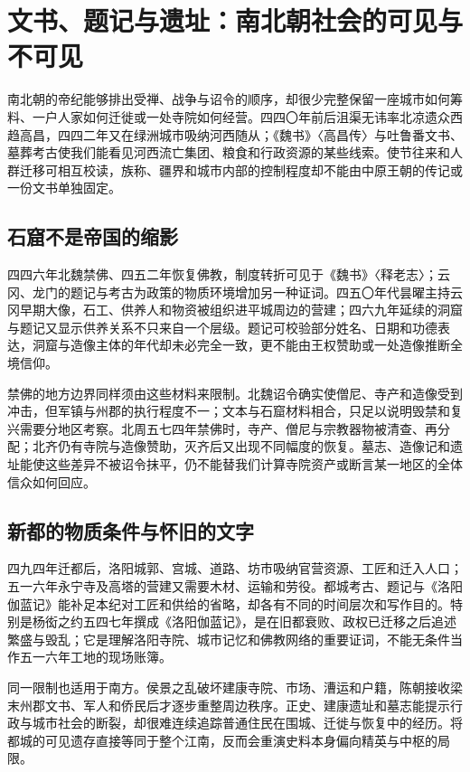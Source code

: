 \section{文书、题记与遗址：南北朝社会的可见与不可见}
\label{sec:northern-southern-documents-material}

南北朝的帝纪能够排出受禅、战争与诏令的顺序，却很少完整保留一座城市如何筹料、一户人家如何迁徙或一处寺院如何经营。四四〇年前后沮渠无讳率北凉遗众西趋高昌，四四二年又在绿洲城市吸纳河西随从；《魏书》〈高昌传〉与吐鲁番文书、墓葬考古使我们能看见河西流亡集团、粮食和行政资源的某些线索。使节往来和人群迁移可相互校读，族称、疆界和城市内部的控制程度却不能由中原王朝的传记或一份文书单独固定。

\subsection{石窟不是帝国的缩影}

四四六年北魏禁佛、四五二年恢复佛教，制度转折可见于《魏书》〈释老志〉；云冈、龙门的题记与考古为政策的物质环境增加另一种证词。四五〇年代昙曜主持云冈早期大像，石工、供养人和物资被组织进平城周边的营建；四六九年延续的洞窟与题记又显示供养关系不只来自一个层级。题记可校验部分姓名、日期和功德表达，洞窟与造像主体的年代却未必完全一致，更不能由王权赞助或一处造像推断全境信仰。

禁佛的地方边界同样须由这些材料来限制。北魏诏令确实使僧尼、寺产和造像受到冲击，但军镇与州郡的执行程度不一；文本与石窟材料相合，只足以说明毁禁和复兴需要分地区考察。北周五七四年禁佛时，寺产、僧尼与宗教器物被清查、再分配；北齐仍有寺院与造像赞助，灭齐后又出现不同幅度的恢复。墓志、造像记和遗址能使这些差异不被诏令抹平，仍不能替我们计算寺院资产或断言某一地区的全体信众如何回应。

\subsection{新都的物质条件与怀旧的文字}

四九四年迁都后，洛阳城郭、宫城、道路、坊市吸纳官营资源、工匠和迁入人口；五一六年永宁寺及高塔的营建又需要木材、运输和劳役。都城考古、题记与《洛阳伽蓝记》能补足本纪对工匠和供给的省略，却各有不同的时间层次和写作目的。特别是杨衒之约五四七年撰成《洛阳伽蓝记》，是在旧都衰败、政权已迁移之后追述繁盛与毁乱；它是理解洛阳寺院、城市记忆和佛教网络的重要证词，不能无条件当作五一六年工地的现场账簿。

同一限制也适用于南方。侯景之乱破坏建康寺院、市场、漕运和户籍，陈朝接收梁末州郡文书、军人和侨民后才逐步重整周边秩序。正史、建康遗址和墓志能提示行政与城市社会的断裂，却很难连续追踪普通住民在围城、迁徙与恢复中的经历。将都城的可见遗存直接等同于整个江南，反而会重演史料本身偏向精英与中枢的局限。

